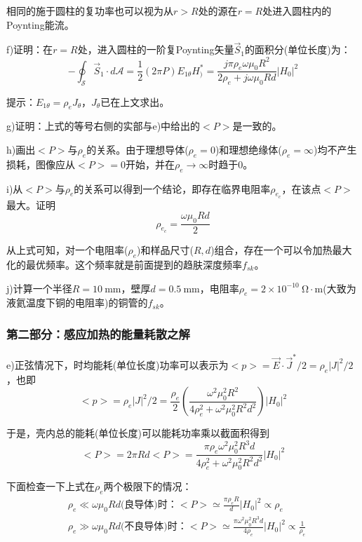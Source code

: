 相同的施于圆柱的复功率也可以视为从$r>R$处的源在$r=R$处进入圆柱内的Poynting能流。

f)证明：在$r=R$处，进入圆柱的一阶复Poynting矢量$\vec{S}_1$的面积分(单位长度)为：
\begin{equation}
-\oint_{\mathcal{S}}\vec{S}_1 \cdot d\mathcal{A}=\frac{1}{2}(2\pi P)E_{1\theta} H_)^*=\frac{j\pi\rho_e\omega\mu_0 R^2}{2\rho_e+j\omega\mu_0 R d}|H_0|^2
\end{equation}

提示：$E_{1\theta}=\rho_e J_\theta$，$J_\theta$已在上文求出。

g)证明：上式的等号右侧的实部与e)中给出的$<P>$是一致的。

h)画出$<P>$与$\rho_e$的关系。由于理想导体($\rho_e=0$)和理想绝缘体($\rho_e=\infty$)均不产生损耗，图像应从$<P>=0$开始，并在$\rho_e \rightarrow \infty$时趋于0。

i)从$<P>$与$\rho_e$的关系可以得到一个结论，即存在临界电阻率$\rho_{e_c}$，在该点$<P>$最大。证明
\begin{equation}
\rho_{e_c}=\frac{\omega \mu_0 R d}{2}
\end{equation}

从上式可知，对一个电阻率($\rho_e$)和样品尺寸($R,d$)组合，存在一个可以令加热最大化的最优频率。这个频率就是前面提到的趋肤深度频率$f_{sk}$。

j)计算一个半径$R=10\ \mathrm{mm}$，壁厚$d=0.5\ \mathrm{mm}$，电阻率$\rho_e=2\times 10^{-10}\ \mathrm{\Omega\cdot m} $(大致为液氦温度下铜的电阻率)的铜管的$f_{sk}$。

\subsubsection*{第二部分：感应加热的能量耗散之解}
e)正弦情况下，时均能耗(单位长度)功率可以表示为$<p>=\vec{E}\cdot \vec{J}^* /2=\rho_e |J|^2 /2$，也即
\begin{equation*}
<p>=\rho_e |J|^2 /2=\frac{\rho_e}{2}(\frac{\omega^2 \mu_0^2 R^2}{4\rho_e^2+\omega^2 \mu_0^2 R^2 d^2})|H_0|^2 \tag{S7.9}
\end{equation*}

于是，壳内总的能耗(单位长度)可以能耗功率乘以截面积得到
\begin{equation*}
<P>=2\pi R d<P>=\frac{\pi \rho_e \omega^2 \mu_0^2 R^3 d}{4\rho_e^2+\omega^2 \mu_0^2 R^2 d^2}|H_0|^2 \tag{2.63}
\end{equation*}

下面检查一下上式在$\rho_e$两个极限下的情况：
\begin{align}
&\rho_e \ll \omega \mu_0 R d\mbox{(良导体)时：}<P>\simeq \frac{\pi \rho_e R}{d}|H_0|^2\propto \rho_e\nonumber\tag{S7.10a}\\
&\rho_e \gg \omega \mu_0 R d\mbox{(不良导体)时：}<P>\simeq \frac{\pi \omega^2 \mu_0^2 R^3 d}{4\rho_e}|H_0|^2\propto \frac{1}{\rho_e}\nonumber\tag{S7.10b}
\end{align}

